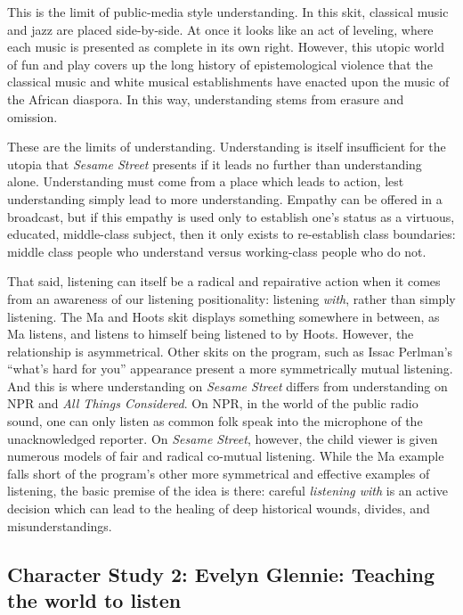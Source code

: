 \documentclass[12pt,letterpaper]{article}
\newcommand{\ses}{\textit{Sesame Street }}
\begin{document}
	This is the limit of public-media style understanding. In this skit, 
	classical music and jazz are placed side-by-side. At once it looks like
	an act of leveling, where each music is presented as complete in its own
	right. However, this utopic world of fun and play covers up the long 
	history of epistemological violence that the classical music and white 
	musical establishments have enacted upon the music of the African 
	diaspora. In this way, understanding stems from erasure and omission.

	These are the limits of understanding. Understanding is itself 
	insufficient for the utopia that \ses presents if it leads no further 
	than understanding alone. Understanding must come from a place which 
	leads to
	 action, lest understanding simply lead to more understanding. 
	Empathy can be offered in a 
	broadcast, but if this empathy is used only to establish one's status 
	as a virtuous, educated, middle-class subject, then it only exists to 
	re-establish class boundaries: middle class people who understand 
	versus working-class people who do not.  
	 
	That said, listening can itself be a radical and repairative action when
	it comes from an awareness of our listening positionality: listening 
	\textit{with}, rather than simply listening. The Ma and Hoots skit 
	displays something somewhere in between, as Ma listens, and listens to 
	himself being listened to by Hoots. However, the relationship is 
	asymmetrical. Other skits on the program, such as Issac Perlman's 
	``what's hard for you'' appearance present a more symmetrically mutual 
	listening. And this is where understanding on \ses differs from 
	understanding on NPR and \textit{All Things Considered}. On NPR, in the
	world of the public radio sound, one can only listen as common folk 
	speak into the microphone of the unacknowledged reporter. On 
	\textit{Sesame Street}, 
	however, the child viewer is given numerous models of fair and radical 
	co-mutual listening. While the Ma example falls short of the program's 
	other more symmetrical and effective examples of listening, the basic 
	premise
	of the idea is there: careful \textit{listening with} is an active
	decision which can lead to the healing of deep historical wounds, 
	divides, and misunderstandings.

	\subsection*{Character Study 2: Evelyn Glennie: Teaching the world to
	 listen} 
\end{document}
